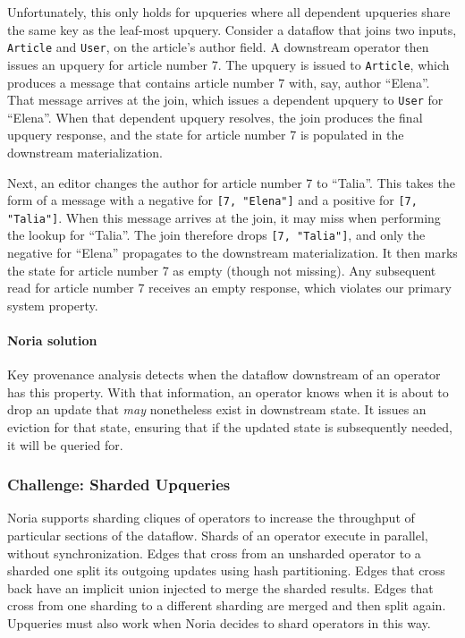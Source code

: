 \documentclass[12pt,letterpaper,twoside]{article}
\begin{document}
Unfortunately, this only holds for upqueries where all dependent
upqueries share the same key as the leaf-most upquery. Consider a
dataflow that joins two inputs, \texttt{Article} and \texttt{User}, on the article's
author field. A downstream operator then issues an upquery for article
number 7. The upquery is issued to \texttt{Article}, which produces a message
that contains article number 7 with, say, author ``Elena''. That message
arrives at the join, which issues a dependent upquery to \texttt{User} for
``Elena''. When that dependent upquery resolves, the join produces the
final upquery response, and the state for article number 7 is populated
in the downstream materialization.

Next, an editor changes the author for article number 7 to ``Talia''. This
takes the form of a message with a negative for \texttt{[7, "Elena"]} and a
positive for \texttt{[7, "Talia"]}. When this message arrives at the join, it
may miss when performing the lookup for ``Talia''. The join therefore
drops \texttt{[7, "Talia"]}, and only the negative for ``Elena'' propagates to
the downstream materialization. It then marks the state for article
number 7 as empty (though not missing). Any subsequent read for article
number 7 receives an empty response, which violates our primary system
property.

\paragraph{Noria solution}
Key provenance analysis detects when the dataflow downstream of an operator has
this property. With that information, an operator knows when it is about to drop
an update that \emph{may} nonetheless exist in downstream state. It issues an
eviction for that state, ensuring that if the updated state is subsequently
needed, it will be queried for.

\subsubsection{Challenge: Sharded Upqueries}

Noria supports sharding cliques of operators to increase the throughput
of particular sections of the dataflow. Shards of an operator execute in
parallel, without synchronization. Edges that cross from an unsharded
operator to a sharded one split its outgoing updates using hash
partitioning. Edges that cross back have an implicit union injected to
merge the sharded results. Edges that cross from one sharding to a
different sharding are merged and then split again. Upqueries must also
work when Noria decides to shard operators in this way.
\end{document}
